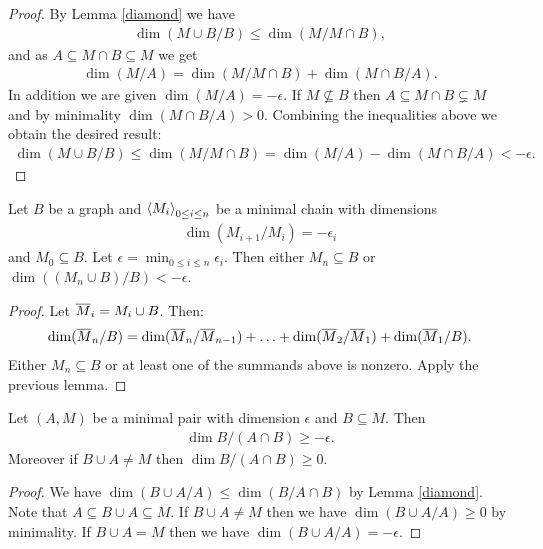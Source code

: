 \begin{proof}
  By Lemma \ref{diamond} we have
  \begin{align*}
    \dim(M \cup B/B) \leq \dim(M / M \cap B),
  \end{align*}
  and as $A \subseteq M \cap B \subseteq M$ we get
  \begin{align*}
    \dim (M/A) = \dim(M / M \cap B) + \dim(M \cap B / A).
  \end{align*}
  In addition we are given $\dim (M/A) = -\epsilon$.
  If $M \not\subseteq B$ then $A \subseteq M \cap B \subsetneq M$ and by minimality $\dim(M \cap B / A) > 0$.
  Combining the inequalities above we obtain the desired result:
  \begin{align*}
    \dim(M \cup B/B) \leq \dim(M / M \cap B) = \dim (M/A) - \dim(M \cap B / A) < -\epsilon.
  \end{align*}
\end{proof}

\begin{Lemma}	\label{chain_lemma}
  Let $B$ be a graph and $\left\langle M_i \right\rangle_{0 \leq i \leq n}$ be a minimal chain with dimensions
  \begin{align*}
    \dim(M_{i+1}/M_i) = -\epsilon_i
  \end{align*}
  and $M_0 \subseteq B$.
  Let $\epsilon = \min_{0 \leq i \leq n} \epsilon_i$.
  Then either $M_n \subseteq B$ or $\dim((M_n \cup B)/B) < -\epsilon$.
\end{Lemma}

\begin{proof}
  Let ${\overline{M}}_i = M_i \cup B$. Then:
  \begin{align*}
    \dim({\overline{M}}_n/B) = \dim({\overline{M}}_n/{\overline{M}}_{n-1}) + \ldots + \dim({\overline{M}}_2/{\overline{M}}_1) + \dim({\overline{M}}_1/B).
  \end{align*}
  Either $M_n \subseteq B$ or at least one of the summands above is nonzero.
  Apply the previous lemma.
\end{proof}

\begin{Lemma} \label{minimal_subset}
  Let $(A, M)$ be a minimal pair with dimension $\epsilon$ and $B \subseteq M$.
  Then
  \begin{align*}
    \dim B / (A \cap B) \geq -\epsilon.    
  \end{align*}
  Moreover if $B \cup A \neq M$ then $\dim B / (A \cap B) \geq 0$.
\end{Lemma}

\begin{proof}
  We have $\dim (B \cup A / A) \leq \dim (B / A \cap B)$ by Lemma \ref{diamond}.
  Note that $A \subseteq B \cup A \subseteq M$.
  If $B \cup A \neq M$ then we have $\dim (B \cup A / A) \geq 0$ by minimality.
  If $B \cup A = M$ then we have $\dim (B \cup A / A) = -\epsilon$.
\end{proof}


